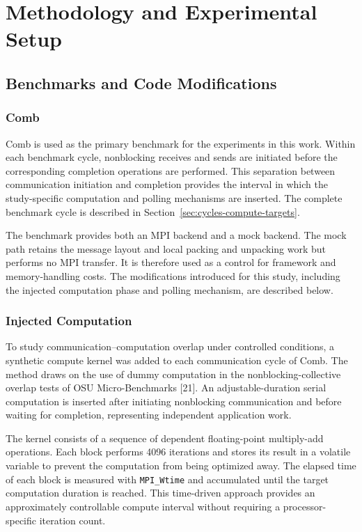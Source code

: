 
\chapter{Methodology and Experimental Setup}\label{chapter:methodology}

\section{Benchmarks and Code Modifications}

\subsection{Comb}

Comb is used as the primary benchmark for the experiments in this work. Within each benchmark cycle, nonblocking receives and sends are initiated before the corresponding completion operations are performed. This separation between communication initiation and completion provides the interval in which the study-specific computation and polling mechanisms are inserted. The complete benchmark cycle is described in Section~\ref{sec:cycles-compute-targets}.

The benchmark provides both an MPI backend and a mock backend. The mock path retains the message layout and local packing and unpacking work but performs no MPI transfer. It is therefore used as a control for framework and memory-handling costs. The modifications introduced for this study, including the injected computation phase and polling mechanism, are described below.


\subsection{Injected Computation}

To study communication--computation overlap under controlled conditions, a synthetic compute kernel was added to each communication cycle of Comb. The method draws on the use of dummy computation in the nonblocking-collective overlap tests of OSU Micro-Benchmarks [21]. An adjustable-duration serial computation is inserted after initiating nonblocking communication and before waiting for completion, representing independent application work.

The kernel consists of a sequence of dependent floating-point multiply-add operations. Each block performs 4096 iterations and stores its result in a volatile variable to prevent the computation from being optimized away. The elapsed time of each block is measured with \texttt{MPI\_Wtime} and accumulated until the target computation duration is reached. This time-driven approach provides an approximately controllable compute interval without requiring a processor-specific iteration count.

